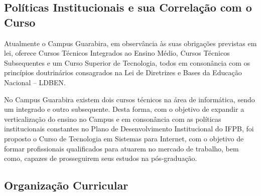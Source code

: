\subsection{Pol\'iticas Institucionais e sua Correla\c{c}\~ao com o Curso}

        Atualmente o Campus Guarabira, em observância às suas obrigações previstas em lei, oferece Cursos Técnicos Integrados ao Ensino Médio, Cursos Técnicos Subsequentes e um Curso Superior de Tecnologia, todos em consonância com os princípios doutrinários consagrados na Lei de Diretrizes e Bases da Educação Nacional – LDBEN. 

        No Campus Guarabira existem dois cursos técnicos na \'area de inform\'atica, sendo um integrado e outro subsequente. Desta forma, com o objetivo de expandir a verticalização do ensino no Campus e em consonância com as políticas institucionais constantes no Plano de Desenvolvimento Institucional do IFPB, foi proposto o Curso de Tecnologia em Sistemas para Internet, com o objetivo de formar profissionais qualificados para atuarem no mercado de trabalho, bem como, capazes de prosseguirem seus estudos na pós-graduação. 

\newpage
\subsection{Organiza\c{c}\~ao Curricular}

